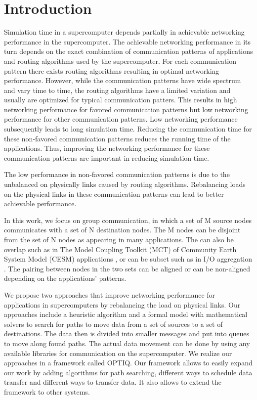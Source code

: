\section{Introduction}
\label{sec:intro}
Simulation time in a supercomputer depends partially in achievable networking performance in the supercomputer. The achievable networking performance in its turn depends on the exact combination of communication patterns of applications and routing algorithms used by the supercomputer. For each communication pattern there exists routing algorithms resulting in optimal networking performance. However, while the communication patterns have wide spectrum and vary time to time, the routing algorithms have a limited variation and usually are optimized for typical communication patters. This results in high networking performance for favored communication patterns but low networking performance for other communication patterns. Low networking performance subsequently leads to long simulation time. Reducing the communication time for these non-favored communication patterns reduces the running time of the applications. Thus, improving the networking performance for these communication patterns are important in reducing simulation time. 

The low performance in non-favored communication patterns is due to the unbalanced on physically links caused by routing algorithms. Rebalancing loads on the physical links in these communication patterns can lead to better achievable performance. 

In this work, we focus on group communication, in which a set of M source nodes communicates with a set of N destination nodes. The M nodes can be disjoint from the set of N nodes as appearing in many applications. The can also be overlap such as in The Model Coupling Toolkit (MCT) of Community Earth System Model (CESM) applications \cite{MCT:Jacob}, or can be subset such as in I/O aggregation \cite{Vishwanath:GLEAN}. The pairing between nodes in the two sets can be aligned or can be non-aligned depending on the applications' patterns.

We propose two approaches that improve networking performance for applications in supercomputers by rebalancing the load on physical links. Our approaches include a heuristic algorithm and a formal model with mathematical solvers to search for paths to move data from a set of sources to a set of destinations. The data then is divided into smaller messages and put into queues to move along found paths. The actual data movement can be done by using any available libraries for communication on the supercomputer. We realize our approaches in a framework called OPTIQ. Our framework allows to easily expand our work by adding algorithms for path searching, different ways to schedule data transfer and different ways to transfer data. It also allows to extend the framework to other systems.

